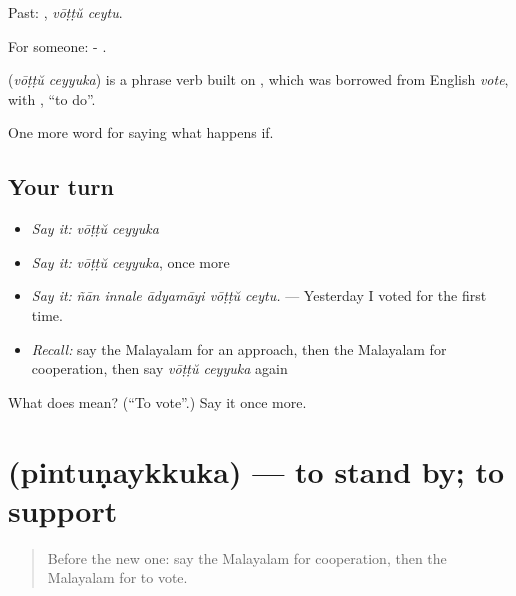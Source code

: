 Past:  , \emph{vōṭṭŭ ceytu}.

For someone: -  .

\begin{cousinweb}
\textbf{ } (\emph{vōṭṭŭ ceyyuka}) is a phrase verb built on , which was borrowed from English \emph{vote}, with , \textquotedblleft{}to do\textquotedblright{}.
\end{cousinweb}

\begin{grammarlens}[title={What you've built}]
One more word for saying what happens if.
\end{grammarlens}

\subsection*{Your turn}
\begin{itemize}
\raggedright
  \item \emph{Say it:} \emph{vōṭṭŭ ceyyuka}
  \item \emph{Say it:} \emph{vōṭṭŭ ceyyuka}, once more
  \item \emph{Say it:} \emph{ñān innale ādyamāyi vōṭṭŭ ceytu.} — Yesterday I voted for the first time.
  \item \emph{Recall:} say the Malayalam for an approach, then the Malayalam for cooperation, then say \emph{vōṭṭŭ ceyyuka} again
\end{itemize}

\begin{tcolorbox}[breakable,colback=teal!4,colframe=teal!35!black,title={Before you move on}]
What does   mean? (\textquotedblleft{}To vote\textquotedblright{}.) Say it once more.
\end{tcolorbox}
\section[\texorpdfstring{\ml{പിന്തുണയ്ക്കുക} (pintuṇaykkuka)}{പിന്തുണയ്ക്കുക (pintuṇaykkuka)}]{ (pintuṇaykkuka) — to stand by; to support}

\label{lesson:ML-C453-pintunaykkuka}



\begin{quote}
Before the new one: say the Malayalam for cooperation, then the Malayalam for to vote.
\end{quote}

